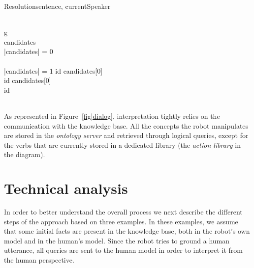 \documentclass[twocolumn]{svjour3}
\begin{document}
\small
\begin{pseudocode}[ruled]{Resolution}{sentence, currentSpeaker}
\label{algo|Resolution}

 \GETS {} \\

\FOREACH g \in {} \DO 
\BEGIN
    \GETS {} \\
   candidates \GETS {} \\
   
   \IF \left|{candidates}\right| = 0 \THEN
    \BEGIN
       \\
      \EXIT \\
    \END
   \ELSEIF \left|{candidates}\right| = 1 \THEN
      id \GETS candidates[0] \\

   \ELSE
      \BEGIN
	\IF {} \THEN
	  id \GETS candidates[0] \\
	\ELSE
	  id \GETS {} \\ %
      \END \\
\END
\end{pseudocode}
\normalsize

As represented in Figure~\ref{fig|dialog}, interpretation tightly relies on the
communication with the knowledge base. All the concepts the robot manipulates
are stored in the \textit{ontology server} and retrieved through logical
queries, except for the verbs that are currently stored in a dedicated library
(the \emph{action library} in the diagram).

\section{Technical analysis}
\label{examples}


In order to better understand the overall process we next describe the
different steps of the approach based on three examples. In these examples, we
assume that some initial facts are present in the knowledge base, both in the
robot's own model and in the human's model.  Since the robot tries to ground a
human utterance, all queries are sent to the human model in order to interpret
it from the human perspective. 
\end{document}
